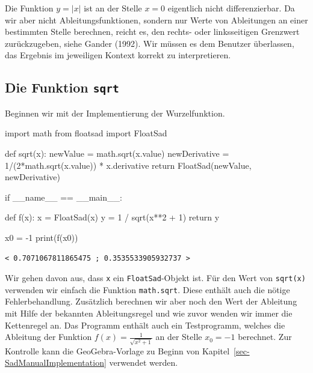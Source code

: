 \documentclass[
  a4paper,
  DIV=11]{scrreprt}
\newenvironment{Shaded}{\begin{snugshade}}{\end{snugshade}}
\newcommand{\BuiltInTok}[1]{\textcolor[rgb]{0.00,0.23,0.31}{#1}}
\newcommand{\ControlFlowTok}[1]{\textcolor[rgb]{0.00,0.23,0.31}{#1}}
\newcommand{\DecValTok}[1]{\textcolor[rgb]{0.68,0.00,0.00}{#1}}
\newcommand{\ImportTok}[1]{\textcolor[rgb]{0.00,0.46,0.62}{#1}}
\newcommand{\KeywordTok}[1]{\textcolor[rgb]{0.00,0.23,0.31}{#1}}
\newcommand{\NormalTok}[1]{\textcolor[rgb]{0.00,0.23,0.31}{#1}}
\newcommand{\OperatorTok}[1]{\textcolor[rgb]{0.37,0.37,0.37}{#1}}
\newcommand{\StringTok}[1]{\textcolor[rgb]{0.13,0.47,0.30}{#1}}
\newcommand{\VariableTok}[1]{\textcolor[rgb]{0.07,0.07,0.07}{#1}}
\theoremstyle{definition}
\theoremstyle{definition}
\theoremstyle{remark}
\begin{document}
Die Funktion \(y=|x|\) ist an der Stelle \(x=0\) eigentlich nicht
differenzierbar. Da wir aber nicht Ableitungsfunktionen, sondern nur
Werte von Ableitungen an einer bestimmten Stelle berechnen, reicht es,
den rechts- oder linksseitigen Grenzwert zurückzugeben, siehe Gander
(1992). Wir müssen es dem Benutzer überlassen, das Ergebnis im
jeweiligen Kontext korrekt zu interpretieren.

\hypertarget{die-funktion-sqrt}{%
\subsection{\texorpdfstring{Die Funktion
\texttt{sqrt}}{Die Funktion sqrt}}\label{die-funktion-sqrt}}

Beginnen wir mit der Implementierung der Wurzelfunktion.

\begin{Shaded}
\begin{Highlighting}[]
\ImportTok{import}\NormalTok{ math}
\ImportTok{from}\NormalTok{ floatsad }\ImportTok{import}\NormalTok{ FloatSad}

\KeywordTok{def}\NormalTok{ sqrt(x):}
\NormalTok{    newValue }\OperatorTok{=}\NormalTok{ math.sqrt(x.value)}
\NormalTok{    newDerivative }\OperatorTok{=} \DecValTok{1}\OperatorTok{/}\NormalTok{(}\DecValTok{2}\OperatorTok{*}\NormalTok{math.sqrt(x.value)) }\OperatorTok{*}\NormalTok{ x.derivative}
    \ControlFlowTok{return}\NormalTok{ FloatSad(newValue, newDerivative)}

\ControlFlowTok{if} \VariableTok{\_\_name\_\_} \OperatorTok{==} \StringTok{\textquotesingle{}\_\_main\_\_\textquotesingle{}}\NormalTok{:}

    \KeywordTok{def}\NormalTok{ f(x):}
\NormalTok{        x }\OperatorTok{=}\NormalTok{ FloatSad(x)}
\NormalTok{        y }\OperatorTok{=} \DecValTok{1} \OperatorTok{/}\NormalTok{ sqrt(x}\OperatorTok{**}\DecValTok{2} \OperatorTok{+} \DecValTok{1}\NormalTok{)}
        \ControlFlowTok{return}\NormalTok{ y}

\NormalTok{    x0 }\OperatorTok{=} \OperatorTok{{-}}\DecValTok{1}
    \BuiltInTok{print}\NormalTok{(f(x0))}
\end{Highlighting}
\end{Shaded}

\begin{verbatim}
< 0.7071067811865475 ; 0.3535533905932737 >
\end{verbatim}

Wir gehen davon aus, dass \texttt{x} ein \texttt{FloatSad}-Objekt ist.
Für den Wert von \texttt{sqrt(x)} verwenden wir einfach die Funktion
\texttt{math.sqrt}. Diese enthält auch die nötige Fehlerbehandlung.
Zusätzlich berechnen wir aber noch den Wert der Ableitung mit Hilfe der
bekannten Ableitungsregel und wie zuvor wenden wir immer die Kettenregel
an. Das Programm enthält auch ein Testprogramm, welches die Ableitung
der Funktion \(f(x) = \frac{1}{\sqrt{x^2+1}}\) an der Stelle
\(x_0 = -1\) berechnet. Zur Kontrolle kann die GeoGebra-Vorlage zu
Beginn von Kapitel~\ref{sec-SadManualImplementation} verwendet werden.
\end{document}
